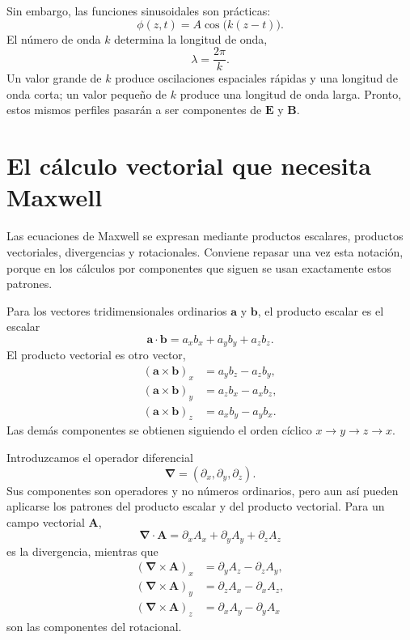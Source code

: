 Sin embargo, las funciones sinusoidales son prácticas:
\begin{equation}
\phi(z,t)=A\cos\!\bigl(k(z-t)\bigr).
\end{equation}
El número de onda \(k\) determina la longitud de onda,
\begin{equation}
\lambda=\frac{2\pi}{k}.
\end{equation}
Un valor grande de \(k\) produce oscilaciones espaciales rápidas y una longitud de onda corta; un valor pequeño de \(k\) produce una longitud de onda larga. Pronto, estos mismos perfiles pasarán a ser componentes de \(\mathbf E\) y \(\mathbf B\).

\section{El cálculo vectorial que necesita Maxwell}

Las ecuaciones de Maxwell se expresan mediante productos escalares, productos vectoriales, divergencias y rotacionales. Conviene repasar una vez esta notación, porque en los cálculos por componentes que siguen se usan exactamente estos patrones.

Para los vectores tridimensionales ordinarios \(\mathbf a\) y \(\mathbf b\), el producto escalar es el escalar
\begin{equation}
\mathbf a\cdot\mathbf b
=a_xb_x+a_yb_y+a_zb_z.
\end{equation}
El producto vectorial es otro vector,
\begin{align}
(\mathbf a\times\mathbf b)_x&=a_yb_z-a_zb_y,\\
(\mathbf a\times\mathbf b)_y&=a_zb_x-a_xb_z,\\
(\mathbf a\times\mathbf b)_z&=a_xb_y-a_yb_x.
\end{align}
Las demás componentes se obtienen siguiendo el orden cíclico \(x\to y\to z\to x\).

Introduzcamos el operador diferencial
\begin{equation}
\boldsymbol\nabla=
\left(\partial_x,\partial_y,\partial_z\right).
\end{equation}
Sus componentes son operadores y no números ordinarios, pero aun así pueden aplicarse los patrones del producto escalar y del producto vectorial. Para un campo vectorial \(\mathbf A\),
\begin{equation}
\boldsymbol\nabla\cdot\mathbf A
=\partial_xA_x+\partial_yA_y+\partial_zA_z
\label{eq:divergence}
\end{equation}
es la divergencia, mientras que
\begin{align}
(\boldsymbol\nabla\times\mathbf A)_x
 &=\partial_yA_z-\partial_zA_y,\\
(\boldsymbol\nabla\times\mathbf A)_y
 &=\partial_zA_x-\partial_xA_z,\\
(\boldsymbol\nabla\times\mathbf A)_z
 &=\partial_xA_y-\partial_yA_x
\label{eq:curl}
\end{align}
son las componentes del rotacional.

